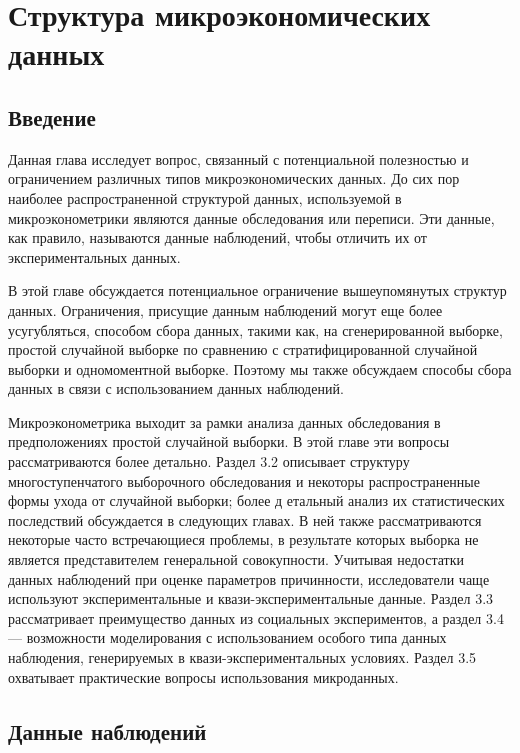 

\chapter{Структура микроэкономических данных}

\section{Введение}

Данная глава исследует вопрос, связанный с потенциальной полезностью и ограничением различных типов микроэкономических данных. До сих пор наиболее распространенной структурой данных, используемой в микроэконометрики являются данные обследования или переписи. Эти данные, как правило, называются данные наблюдений, чтобы отличить их от экспериментальных данных.


В этой главе обсуждается потенциальное ограничение вышеупомянутых структур данных. Ограничения, присущие данным наблюдений могут еще более усугубляться, способом сбора данных, такими как, на сгенерированной выборке, простой случайной выборке по сравнению с стратифицированной случайной выборки и одномоментной выборке. Поэтому мы также обсуждаем способы сбора данных в связи с использованием данных наблюдений. 
	
	
Микроэконометрика выходит за рамки анализа данных обследования в предположениях простой случайной выборки. В этой главе эти вопросы рассматриваются более детально. Раздел 3.2 описывает структуру многоступенчатого выборочного обследования и некоторы распространенные формы ухода от случайной выборки; более д	етальный анализ их статистических последствий обсуждается в следующих главах. В ней также рассматриваются некоторые часто встречающиеся проблемы, в результате которых выборка не является представителем генеральной совокупности. Учитывая недостатки данных наблюдений при оценке параметров причинности, исследователи чаще используют экспериментальные и квази-экспериментальные данные. Раздел 3.3 рассматривает преимущество данных из социальных экспериментов, а раздел 3.4 --- возможности моделирования с использованием особого типа данных наблюдения, генерируемых в квази-экспериментальных условиях. Раздел 3.5 охватывает практические вопросы использования микроданных.
	
\section{Данные наблюдений}

